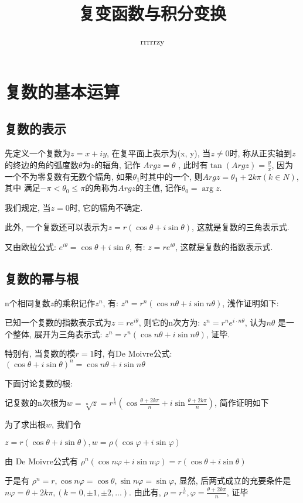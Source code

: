 \documentclass[12pt, a4paper, oneside]{ctexart}
\title{复变函数与积分变换}
\author{rrrrrzy}
\begin{document}
\maketitle
\section{复数的基本运算}
\subsection{复数的表示}
先定义一个复数为$z = x + iy$, 在复平面上表示为(x, y), 当$z\neq 0$时, 
称从正实轴到$z$的终边的角的弧度数$\theta$为$z$的辐角, 记作 $Argz=\theta $
, 此时有$\tan (Argz) = \frac{y}{x}$, 因为一个不为零复数有无数个辐角, 
如果$\theta_{1}$时其中的一个, 则$Argz=\theta_{1}+2k\pi(k\in N)$, 其中
满足$-\pi<\theta_{0}\leq \pi$的角称为$Argz$的主值, 记作$\theta_{0}=\arg z$.

我们规定, 当$z=0$时, 它的辐角不确定.

此外, 一个复数还可以表示为$z=r(\cos\theta+i\sin\theta)$, 这就是复数的三角表示式.

又由欧拉公式: $e^{i\theta}=\cos\theta+i\sin\theta$, 有: $z=re^{i\theta}$, 
这就是复数的指数表示式.

\subsection{复数的幂与根}
n个相同复数$z$的乘积记作$z^{n}$, 有: $z^{n}=r^{n}(\cos n\theta+i\sin n\theta)$, 浅作证明如下:

已知一个复数的指数表示式为$z=re^{i\theta}$, 则它的n次方为: $z^{n}=r^{n}e^{i\cdot n\theta}$, 认为$n\theta$
是一个整体, 展开为三角表示式: $z^{n}=r^{n}(\cos n\theta+i\sin n\theta)$, 证毕.

特别有, 当复数的模$r=1$时, 有De Moivre公式: $(\cos\theta+i\sin\theta)^{n}=\cos n\theta+i\sin n\theta$

下面讨论复数的根:

记复数的n次根为$w=\sqrt[n]{z}=r^{\frac{1}{n}}(\cos\frac{\theta+2k\pi}{n}+i\sin\frac{\theta+2k\pi}{n})$, 简作证明如下

为了求出根$w$, 我们令

\hspace{2em} $z=r(\cos\theta+i\sin\theta), w=\rho (\cos\varphi+i\sin\varphi)$

由 De Moivre公式有 $\rho^{n}(\cos n\varphi+i\sin n\varphi)=r(\cos\theta+i\sin\theta) $

于是有 $\rho^{n}=r, \cos n\varphi=\cos\theta, \sin n\varphi=\sin\varphi$, 显然, 后两式成立的充要条件是 
$n\varphi=\theta+2k\pi, (k=0, \pm1, \pm2,...)$. 由此有, $\rho=r^{\frac{1}{n}}, \varphi=\frac{\theta+2k\pi}{n}$, 证毕
\end{document}
